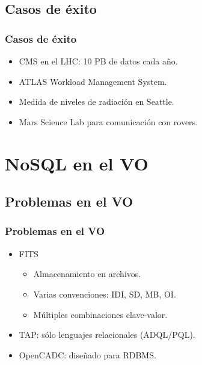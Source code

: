 \documentclass[serif,12pt]{beamer}
\begin{document}
\subsection{Casos de éxito}
\begin{frame}
\frametitle{Casos de éxito}

\begin{itemize}
\item CMS en el LHC: 10 PB de datos cada año.
\item ATLAS Workload Management System.
\item Medida de niveles de radiación en Seattle.
\item Mars Science Lab para comunicación con rovers.
\end{itemize}


\end{frame}





\section{NoSQL en el VO}


\subsection{Problemas en el VO}
\begin{frame}
\frametitle{Problemas en el VO}

\begin{itemize}
\item FITS
  \begin{itemize}
    \item Almacenamiento en archivos.
    \item Varias convenciones: IDI, SD, MB, OI.
    \item Múltiples combinaciones clave-valor.
  \end{itemize}
\item TAP: sólo lenguajes relacionales (ADQL/PQL).
\item OpenCADC: diseñado para RDBMS.
\end{itemize}

\end{frame}



\end{document}
